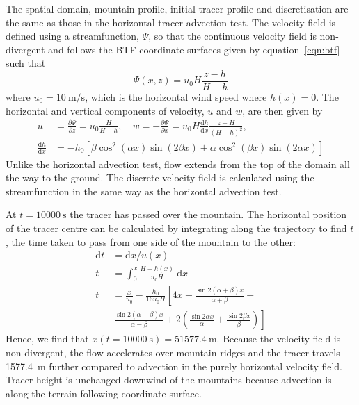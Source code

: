 \documentclass{ametsoc}
\begin{document}
The spatial domain, mountain profile, initial tracer profile and discretisation are the same as those in the horizontal tracer advection test.  The velocity field is defined using a streamfunction, $\Psi$, so that the continuous velocity field is non-divergent and follows the BTF coordinate surfaces given by equation~\ref{eqn:btf} such that
\begin{equation}
	\Psi(x,z) = u_0 H \frac{z - h}{H - h}
\end{equation}
where $u_0 = \SI{10}{\meter\per\second}$, which is the horizontal wind speed where $h(x) = 0$.
The horizontal and vertical components of velocity, $u$ and $w$, are then given by
\begin{align}
	u &= \frac{\partial \Psi}{\partial z} = u_0 \frac{H}{H - h}, \quad w = -\frac{\partial \Psi}{\partial x} = u_0 H \frac{\mathrm{d} h}{\mathrm{d} x} \frac{z - H}{\left( H - h \right)^2}, \nonumber \\
	\frac{\mathrm{d} h}{\mathrm{d} x} &= - h_0 \left[ 
		\beta \cos^2 \left( \alpha x \right) \sin \left( 2 \beta x \right) +
		\alpha \cos^2 \left( \beta x \right) \sin \left( 2 \alpha x \right)
	\right]
\end{align}
Unlike the horizontal advection test, flow extends from the top of the domain all the way to the ground.  The discrete velocity field is calculated using the streamfunction in the same way as the horizontal advection test.

At $t = \SI{10000}{\second}$ the tracer has passed over the mountain.  The horizontal position of the tracer centre can be calculated by integrating along the trajectory to find $t$, the time taken to pass from one side of the mountain to the other:
\begin{align}
	\mathrm{d}t &= \mathrm{d}x / u(x) \\
	t &= \int_0^x \frac{H - h(x)}{u_0 H}\:\mathrm{d}x \\
	t &= \frac{x}{u_0} - \frac{h_0}{16 u_0 H} \left[ 4x + \frac{\sin 2 (\alpha + \beta) x}{\alpha + \beta} \right.+ \nonumber \\
   &\ \left. \frac{\sin 2(\alpha - \beta) x}{\alpha - \beta} + 2 \left( \frac{\sin 2\alpha x}{\alpha} + \frac{\sin 2\beta x}{\beta} \right) \right]
\end{align}
Hence, we find that \(x(t=\SI{10000}{\second}) = \SI{51577.4}{\meter}\).  Because the velocity field is non-divergent, the flow accelerates over mountain ridges and the tracer travels \SI{1577.4}{\meter} further compared to advection in the purely horizontal velocity field.  Tracer height is unchanged downwind of the mountains because advection is along the terrain following coordinate surface.
\end{document}
